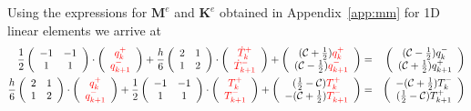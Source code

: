 Using the expressions for ${\bm M}^e$ and ${\bm K}^e$ 
obtained in Appendix~\ref{app:mm} for 1D linear elements we arrive at
\begin{eqnarray}
\frac{1}{2}
\left(
\begin{array}{cc}
-1  & -1 \\
1 & 1
\end{array}
\right)
\cdot 
\left( 
\begin{array}{cc}
    {\color{red}q_k^+}  \\
    {\color{red}q_{k+1}^-}
\end{array}
\right)
+
\frac{h}{6}
\left(
\begin{array}{cc}
2  & 1 \\
1 & 2
\end{array}
\right)
\cdot 
\left(
\begin{array}{c}
{\color{red}\dot{T}_k^+}  \\
{\color{red}\dot{T}_{k+1}^-} 
\end{array}
\right) 
+ 
\left(
\begin{array}{cc}
     ({\cal C}+\frac{1}{2})  {\color{red}q_k^+}  \\
     ({\cal C}-\frac{1}{2})  {\color{red}q_{k+1}^-} 
\end{array}
\right)
&=& 
\left(
\begin{array}{cc}
     ({\cal C}-\frac{1}{2}) q_k^-  \\
     ({\cal C}+\frac{1}{2}) q_{k+1}^+ 
\end{array}
\right)
\nonumber
\\
\frac{h}{6}
\left(
\begin{array}{cc}
2  & 1 \\
1 & 2
\end{array}
\right)
\cdot
\left(
\begin{array}{cc}
    {\color{red}q_k^+}  \\
    {\color{red}q_{k+1}^-}
\end{array}
\right)+
\frac{1}{2}
\left(
\begin{array}{cc}
-1  & -1 \\
1 & 1
\end{array}
\right)
\cdot
\left(
\begin{array}{cc}
 {\color{red}T_k^+}  \\
{\color{red}T_{k+1}^-} 
\end{array}
\right) 
+ \left(
\begin{array}{cc}
     (\frac{1}{2}-{\cal C}) {\color{red}T_k^+}  \\
     -({\cal C}+\frac{1}{2}){\color{red}T_{k+1}^-} 
\end{array}
\right)
&=& \left(
\begin{array}{cc}
     -({\cal C}+\frac{1}{2})  T_k^- \\
     (\frac{1}{2}-{\cal C})  T_{k+1}^+ 
\end{array}
\right) 
\end{eqnarray}

